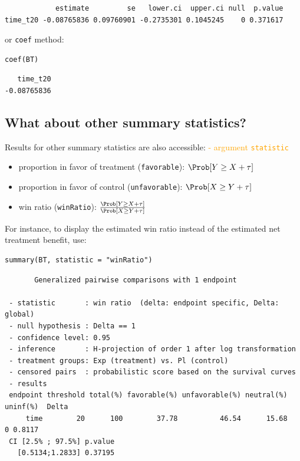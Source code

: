 \documentclass[12pt]{article}
\begin{document}
\begin{verbatim}
            estimate         se   lower.ci  upper.ci null  p.value
time_t20 -0.08765836 0.09760901 -0.2735301 0.1045245    0 0.371617
\end{verbatim}


or \texttt{coef} method:
\lstset{language=r,label= ,caption= ,captionpos=b,numbers=none}
\begin{lstlisting}
coef(BT)
\end{lstlisting}

\begin{verbatim}
   time_t20 
-0.08765836
\end{verbatim}


\bigskip

\subsection{What about other summary statistics?}
\label{sec:org3785c70}

Results for other summary statistics are also accessible: \hfill \textcolor{orange}{- argument \texttt{statistic}}
\begin{itemize}
\item proportion in favor of treatment (\texttt{favorable}): \(\Prob[Y\geq X + \tau]\)
\item proportion in favor of control (\texttt{unfavorable}): \(\Prob[X\geq Y + \tau]\)
\item win ratio (\texttt{winRatio}): \(\frac{\Prob[Y\geq X + \tau]}{\Prob[X\geq Y + \tau]}\)
\end{itemize}

\noindent For instance, to display the estimated win ratio instead of
the estimated net treatment benefit, use:
\lstset{language=r,label= ,caption= ,captionpos=b,numbers=none}
\begin{lstlisting}
summary(BT, statistic = "winRatio")
\end{lstlisting}

\begin{verbatim}
       Generalized pairwise comparisons with 1 endpoint

 - statistic       : win ratio  (delta: endpoint specific, Delta: global) 
 - null hypothesis : Delta == 1 
 - confidence level: 0.95 
 - inference       : H-projection of order 1 after log transformation 
 - treatment groups: Exp (treatment) vs. Pl (control) 
 - censored pairs  : probabilistic score based on the survival curves
 - results
 endpoint threshold total(%) favorable(%) unfavorable(%) neutral(%) uninf(%)  Delta
     time        20      100        37.78          46.54      15.68        0 0.8117
 CI [2.5% ; 97.5%] p.value 
   [0.5134;1.2833] 0.37195
\end{verbatim}
\end{document}

